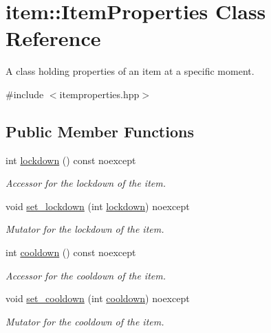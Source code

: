 \hypertarget{classitem_1_1_item_properties}{}\section{item\+:\+:Item\+Properties Class Reference}
\label{classitem_1_1_item_properties}


A class holding properties of an item at a specific moment.  




{\ttfamily \#include $<$itemproperties.\+hpp$>$}

\subsection*{Public Member Functions}
\begin{DoxyCompactItemize}
\item 
int \hyperlink{classitem_1_1_item_properties_a9d1fbd93e6ead012daf5d09a787c0514}{lockdown} () const noexcept
\begin{DoxyCompactList}\small\item\em Accessor for the lockdown of the item. \end{DoxyCompactList}\item 
void \hyperlink{classitem_1_1_item_properties_aa29d6b35f5c5bbdc6920851bf734cf90}{set\+\_\+lockdown} (int \hyperlink{classitem_1_1_item_properties_a9d1fbd93e6ead012daf5d09a787c0514}{lockdown}) noexcept
\begin{DoxyCompactList}\small\item\em Mutator for the lockdown of the item. \end{DoxyCompactList}\item 
int \hyperlink{classitem_1_1_item_properties_ad51e71ee8a456e511c87a6e345acb839}{cooldown} () const noexcept
\begin{DoxyCompactList}\small\item\em Accessor for the cooldown of the item. \end{DoxyCompactList}\item 
void \hyperlink{classitem_1_1_item_properties_aefdce7b5ead1319fff498dc9db102971}{set\+\_\+cooldown} (int \hyperlink{classitem_1_1_item_properties_ad51e71ee8a456e511c87a6e345acb839}{cooldown}) noexcept
\begin{DoxyCompactList}\small\item\em Mutator for the cooldown of the item. \end{DoxyCompactList}\item 

\end{DoxyCompactItemize}
